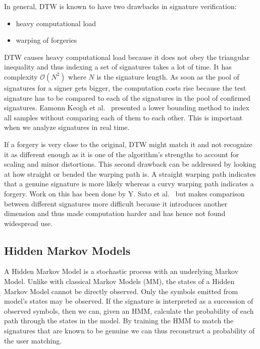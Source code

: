 \documentclass[a4paper, oneside]{csthesis}
\begin{document}
In general, DTW is known to have two drawbacks in signature verification:
\begin{itemize}
\item heavy computational load
\item warping of forgeries
\end{itemize}

DTW causes heavy computational load because it does not obey the triangular inequality and thus indexing a set of signatures takes a lot of time. It has complexity $\mathcal{O}(N^2)$ where $N$ is the signature length. As soon as the pool of signatures for a signer gets bigger, the computation costs rise because the test signature has to be compared to each of the signatures in the pool of confirmed signatures. Eamonn Keogh et al.~\cite{Keogh:2002:EID:1287369.1287405} presented a lower bounding method to index all samples without comparing each of them to each other. This is important when we analyze signatures in real time.

If a forgery is very close to the original, DTW might match it and not recognize it as different enough as it is one of the algorithm's strengths to account for scaling and minor distortions. This second drawback can be addressed by looking at how straight or bended the warping path is. A straight warping path indicates that a genuine signature is more likely whereas a curvy warping path indicates a forgery. Work on this has been done by Y. Sato et al.~\cite{Sato1982} but makes comparison between different signatures more difficult because it introduces another dimension and thus made computation harder and has hence not found widespread use.






\newpage
\subsection{Hidden Markov Models}
\label{sec-hmm}

A Hidden Markov Model is a stochastic process with an underlying Markov Model.
Unlike with classical Markov Models (MM), the states of a Hidden Markov Model cannot be directly observed. Only the symbols emitted from model's states may be observed. If the signature is interpreted as a succession of observed symbols, then we can, given an HMM, calculate the probability of each path through the states in the model. By training the HMM to match the signatures that are known to be genuine we can thus reconstruct a probability of the user matching.
\end{document}

